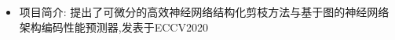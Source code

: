 \begin{itemize}[leftmargin=*]
{\begin{itemize}
      \item 项目简介: 提出了可微分的高效神经网络结构化剪枝方法与基于图的神经网络架构编码性能预测器,发表于ECCV2020
    \end{itemize}
    }

  \end{itemize}
